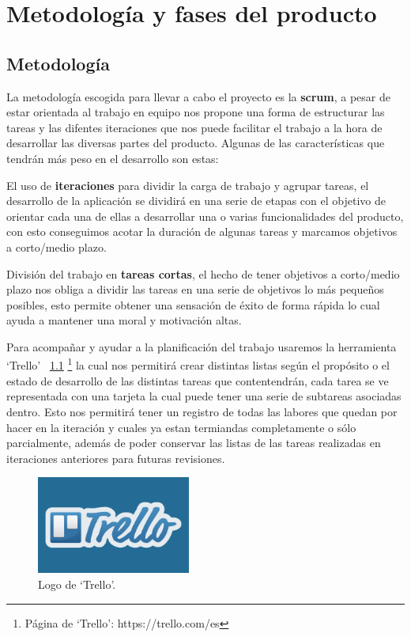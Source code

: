 \chapter{Metodología y fases del producto}
\label{metodologia}
\section{Metodología}
La metodología escogida para llevar a cabo el proyecto es la \textbf{scrum}, a pesar de
estar orientada al trabajo en equipo nos propone una forma de estructurar las tareas y
las difentes iteraciones que nos puede facilitar el trabajo a la hora de desarrollar las
diversas partes del producto. Algunas de las características que tendrán más peso en el
desarrollo son estas:

El uso de \textbf{iteraciones} para dividir la carga de trabajo y agrupar tareas,
el desarrollo de la aplicación se dividirá en una serie de etapas con el objetivo de
orientar cada una de ellas a desarrollar una o varias funcionalidades del producto, con
esto conseguimos acotar la duración de algunas tareas y marcamos objetivos a corto/medio
plazo.
	
División del trabajo en \textbf{tareas cortas}, el hecho de tener objetivos a
corto/medio plazo nos obliga a dividir las tareas en una serie de objetivos lo más
pequeños posibles, esto permite obtener una sensación de éxito de forma rápida lo cual
ayuda a mantener una moral y motivación altas. 

Para acompañar y ayudar a la planificación del trabajo usaremos la herramienta `Trello'
~\ref{img:logo_trello} \footnote{Página de `Trello': https://trello.com/es}
la cual nos permitirá crear distintas listas según el propósito o el estado de
desarrollo de las distintas tareas que contentendrán, cada tarea se ve representada con
una tarjeta la cual puede tener una serie de subtareas asociadas dentro. Esto nos
permitirá tener un registro de todas las labores que quedan por hacer en la iteración y
cuales ya estan termiandas completamente o sólo parcialmente, además de poder conservar
las listas de las tareas realizadas en iteraciones anteriores para futuras revisiones.

\begin{figure}[ht]
\centering
\includegraphics[width=0.45\textwidth]{imagenes/metodologia/logo-trello.png}
\caption{Logo de `Trello'.}
\label{img:logo_trello}
\end{figure}

